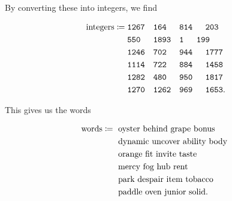\begin{example}
\noindent
By converting these into integers, we find

\begin{align}
    \text{integers} \coloneqq{}
    &\texttt{1267}\quad
    \texttt{164 }\quad
    \texttt{814 }\quad
    \texttt{203 } \nonumber\\
    &\texttt{550 }\quad
    \texttt{1893}\quad
    \texttt{1   }\quad
    \texttt{199 } \nonumber\\
    &\texttt{1246}\quad
    \texttt{702 }\quad
    \texttt{944 }\quad
    \texttt{1777} \nonumber\\
    &\texttt{1114}\quad
    \texttt{722 }\quad
    \texttt{884 }\quad
    \texttt{1458} \nonumber\\
    &\texttt{1282}\quad
    \texttt{480 }\quad
    \texttt{950 }\quad
    \texttt{1817} \nonumber\\
    &\texttt{1270}\quad
    \texttt{1262}\quad
    \texttt{969 }\quad
    \texttt{1653}.
\end{align}

\noindent
This gives us the words

\begin{align}
    \text{words} \coloneqq{}
    & \text{ oyster behind grape bonus } \nonumber\\
    & \text{ dynamic uncover ability body } \nonumber\\
    & \text{ orange fit invite taste } \nonumber\\
    & \text{ mercy fog hub rent } \nonumber\\
    & \text{ park despair item tobacco } \nonumber\\
    & \text{ paddle oven junior solid}.
\end{align}
\end{example}
